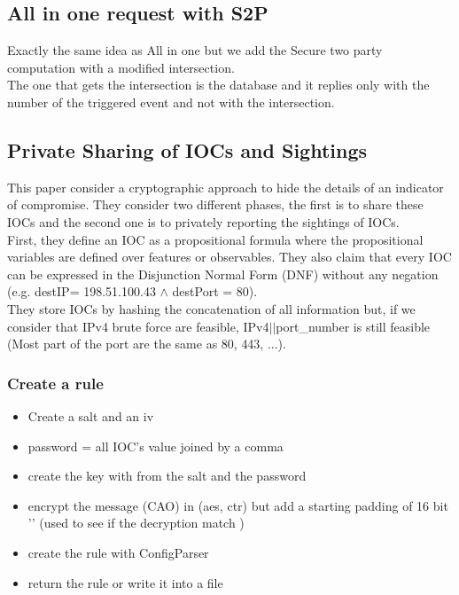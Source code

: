\documentclass[10pt]{article}
\begin{document}
\subsection{All in one request with S2P}
Exactly the same idea as All in one but we add the Secure two party computation with a modified intersection.\\
The one that gets the intersection is the database and it replies only with the number of the triggered event and not with the intersection.




\subsection{Private Sharing of IOCs and Sightings \cite{van2016private}}
This paper consider a cryptographic approach to hide the details of an indicator of compromise. They consider two different phases, the first is to share these IOCs and the second one is to privately reporting the sightings of IOCs. \\
First, they define an IOC as a propositional formula where the propositional variables are defined over features or observables. They also claim that every IOC can be expressed in the Disjunction Normal Form (DNF) without any negation (e.g. destIP= 198.51.100.43 $\land$ destPort = 80).\\
They store IOCs by hashing the concatenation of all information but, if we consider that IPv4 brute force are feasible, IPv4$||$port\_number is still feasible (Most part of the port are the same as 80, 443, ...).\\


\subsubsection{Create a rule}
\begin{itemize}
\item Create a salt and an iv
\item password = all IOC's value joined by a comma
\item create the key with from the salt and the password
\item encrypt the message (CAO) in (aes, ctr) but add a starting padding of 16 bit '' (used to see if the decryption match )
\item create the rule with ConfigParser 
\item return the rule or write it into a file
\end{itemize}
\end{document}

